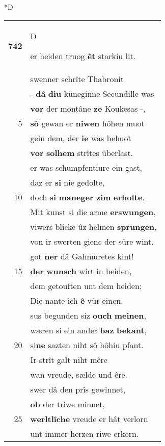 \documentclass[8pt,a4paper,notitlepage]{article}
\begin{document}
\begin{table}[ht]
\begin{minipage}[t]{0.5\linewidth}
\small
\begin{center}*D
\end{center}
\begin{tabular}{rl}
\textbf{742} & \begin{large}D\end{large}er heiden truog \textbf{êt} starkiu lit.\\ 
 & swenner schrîte Thabronit\\ 
 & - \textbf{dâ} \textbf{diu} küneginne Secundille was\\ 
 & \textbf{vor} der montâne \textbf{ze} Koukesas -,\\ 
5 & \textbf{sô} gewan er \textbf{niwen} hôhen muot\\ 
 & gein dem, der \textbf{ie} was behuot\\ 
 & \textbf{vor} \textbf{solhem} strîtes überlast.\\ 
 & er was schumpfentiure ein gast,\\ 
 & daz er \textbf{si} nie gedolte,\\ 
10 & doch \textbf{si} \textbf{maneger} \textbf{zim} \textbf{erholte}.\\ 
 & Mit kunst si die arme \textbf{erswungen},\\ 
 & viwers blicke ûz helmen \textbf{sprungen},\\ 
 & von ir swerten gienc der sûre wint.\\ 
 & got \textbf{ner} dâ Gahmuretes kint!\\ 
15 & \textbf{der} \textbf{wunsch} wirt in beiden,\\ 
 & dem getouften unt dem heiden;\\ 
 & Die nante ich \textbf{ê} vür einen.\\ 
 & sus begunden siz \textbf{ouch} \textbf{meinen},\\ 
 & wæren si ein ander \textbf{baz} \textbf{bekant},\\ 
20 & si\textbf{ne} sazten niht sô hôhiu pfant.\\ 
 & Ir strît galt niht mêre\\ 
 & wan vreude, sælde und êre.\\ 
 & swer dâ den prîs gewinnet,\\ 
 & \textbf{ob} der triwe minnet,\\ 
25 & \textbf{werltlîche} vreude er hât verlorn\\ 
 & unt immer herzen riwe erkorn.\\ 

\end{tabular}
\end{minipage}
\end{table}
\end{document}
